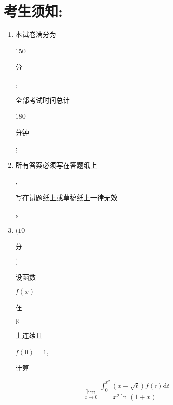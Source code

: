 \documentclass[10pt]{article}
\begin{document}
\section{考生须知:}
\begin{enumerate}
  \item \begin{CJK}{UTF8}{mj}本试卷满分为\end{CJK} 150 \begin{CJK}{UTF8}{mj}分\end{CJK}, \begin{CJK}{UTF8}{mj}全部考试时间总计\end{CJK} 180 \begin{CJK}{UTF8}{mj}分钟\end{CJK};

  \item \begin{CJK}{UTF8}{mj}所有答案必须写在答题纸上\end{CJK}, \begin{CJK}{UTF8}{mj}写在试题纸上或草稿纸上一律无效\end{CJK}。

  \item $(10$ \begin{CJK}{UTF8}{mj}分\end{CJK} $)$ \begin{CJK}{UTF8}{mj}设函数\end{CJK} $f(x)$ \begin{CJK}{UTF8}{mj}在\end{CJK} $\mathbb{R}$ \begin{CJK}{UTF8}{mj}上连续且\end{CJK} $f(0)=1$, \begin{CJK}{UTF8}{mj}计算\end{CJK}

\end{enumerate}
$$
\lim _{x \rightarrow 0} \frac{\int_{0}^{x^{2}}(x-\sqrt{t}) f(t) \mathrm{d} t}{x^{2} \ln (1+x)}
$$
\end{document}
